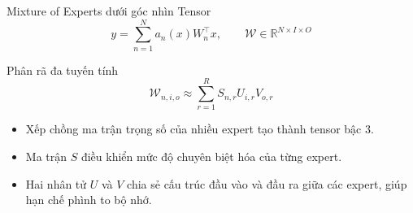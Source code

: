 \begin{frame}{Mixture of Experts dưới góc nhìn Tensor}
    \[
        y
        =
        \sum_{n=1}^{N}
        a_n(x) W_n^\top x,
        \qquad
        \mathcal{W}
        \in
        \mathbb{R}^{N \times I \times O}
    \]

    \begin{block}{Phân rã đa tuyến tính}
        \[
            \mathcal{W}_{n,i,o}
            \approx
            \sum_{r=1}^{R}
            S_{n,r} U_{i,r} V_{o,r}
        \]
    \end{block}

    \begin{itemize}
        \item Xếp chồng ma trận trọng số của nhiều expert tạo thành tensor bậc 3.
        \item Ma trận $S$ điều khiển mức độ chuyên biệt hóa của từng expert.
        \item Hai nhân tử $U$ và $V$ chia sẻ cấu trúc đầu vào và đầu ra giữa các expert, giúp hạn chế phình to bộ nhớ.
    \end{itemize}
\end{frame}


